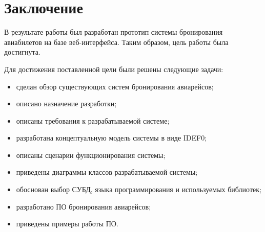 \chapter*{Заключение}

В результате работы был разработан прототип системы бронирования авиабилетов на базе веб-интерфейса. Таким образом, цель работы была достигнута.

Для достижения поставленной цели были решены следующие задачи:

\begin{itemize}
    \item сделан обзор существующих систем бронирования авиарейсов;
    \item описано назначение разработки;
    \item описаны требования к разрабатываемой системе;
    \item разработана концептуальную модель системы в виде IDEF0;
    \item описаны сценарии функционирования системы;
    \item приведены диаграммы классов разрабатываемой системы;
    \item обоснован выбор СУБД, языка программирования и используемых библиотек;
    \item разработано ПО бронирования авиарейсов;
    \item приведены примеры работы ПО.
\end{itemize}
